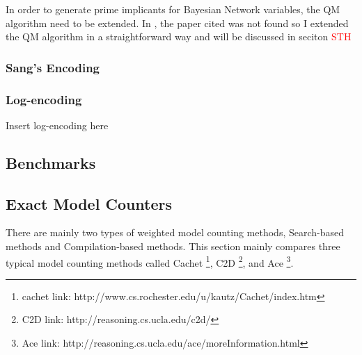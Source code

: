         In order to generate prime implicants for Bayesian Network variables, the QM algorithm need to be extended. In \cite{2006-enc3}, the paper cited was not found so I extended the QM algorithm in a straightforward way and will be discussed in seciton \textcolor{red}{STH}
        
        \subsubsection{Sang's Encoding}
        \cite{Sang:2005:PBI:1619332.1619409}
        \subsubsection{Log-encoding}
        \cite{2016-logencoding}
        Insert log-encoding here
        
        
    \subsection{Benchmarks}
    
    \subsection{Exact Model Counters}
    There are mainly two types of weighted model counting methods, Search-based methods and Compilation-based methods. This section mainly compares three typical model counting methods called Cachet \footnote{cachet link: http://www.cs.rochester.edu/u/kautz/Cachet/index.htm}, C2D \footnote{C2D link: http://reasoning.cs.ucla.edu/c2d/}, and Ace \footnote{Ace link: http://reasoning.cs.ucla.edu/ace/moreInformation.html}.
